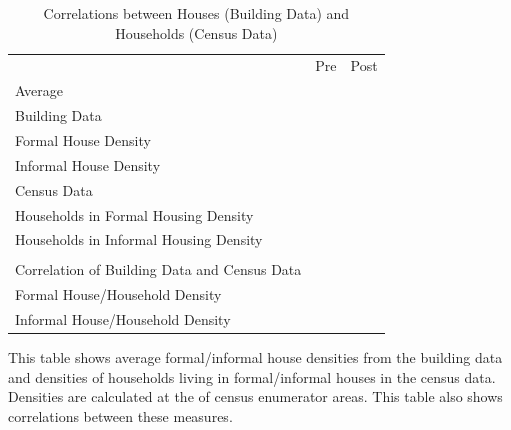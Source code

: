 \documentclass[12pt]{article}
\begin{document}
\begin{table}[ht!]
\small
\centering
\caption{Correlations between Houses (Building Data) and Households (Census Data)  }\label{table:densitycorr}
\vspace{-2mm}
\begin{threeparttable}
\begin{tabular}{lCC}
\toprule
 &Pre & Post \\
Average &  & \\
\midrule
Building Data  \\
\hspace{1cm} Formal House Density&  &  \\
\hspace{1cm} Informal House Density &  &  \\
Census Data  \\
\hspace{1cm} Households in Formal Housing Density&  &  \\
\hspace{1cm} Households in Informal Housing Density &  &  \\
\\
Correlation of Building Data and Census Data \\
\midrule
\hspace{1cm} Formal House/Household Density &  &  \\
\hspace{1cm} Informal House/Household Density &  &  \\
\bottomrule
\end{tabular}
\begin{tablenotes}
\item \footnotesize 
 This table shows average formal/informal house densities from the building data and densities of households living in formal/informal houses in the census data.  Densities are calculated at the of census enumerator areas. This table also shows correlations between these measures.
\end{tablenotes}
\end{threeparttable}
\end{table}
\end{document}
